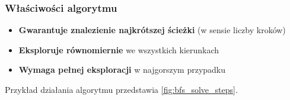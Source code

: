 \documentclass[../../../../doc.tex]{subfiles}
\begin{document}
\subsubsection{Właściwości algorytmu}
\begin{itemize}
  \item \textbf{Gwarantuje znalezienie najkrótszej ścieżki} (w sensie liczby kroków)
  \item \textbf{Eksploruje równomiernie} we wszystkich kierunkach
  \item \textbf{Wymaga pełnej eksploracji} w najgorszym przypadku
\end{itemize}

Przykład działania algorytmu przedstawia \cref{fig:bfs_solve_steps}.
\begin{multicols}{2}
  
\end{multicols}
\end{document}
